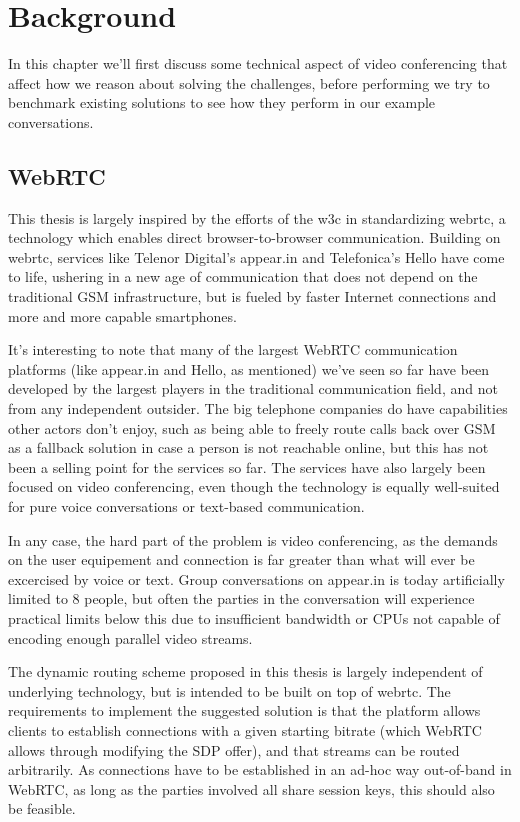 \chapter{Background}
\label{chp:background}

In this chapter we'll first discuss some technical aspect of video conferencing that affect how we reason about solving the challenges, before performing we try to benchmark existing solutions to see how they perform in our example conversations.

\section{WebRTC}

This thesis is largely inspired by the efforts of the \gls{w3c} in standardizing \gls{webrtc}, a technology which enables direct browser-to-browser communication. Building on \gls{webrtc}, services like Telenor Digital's appear.in and Telefonica's Hello have come to life, ushering in a new age of communication that does not depend on the traditional GSM infrastructure, but is fueled by faster Internet connections and more and more capable smartphones.

It's interesting to note that many of the largest WebRTC communication platforms (like appear.in and Hello, as mentioned) we've seen so far have been developed by the largest players in the traditional communication field, and not from any independent outsider. The big telephone companies do have capabilities other actors don't enjoy, such as being able to freely route calls back over GSM as a fallback solution in case a person is not reachable online, but this has not been a selling point for the services so far. The services have also largely been focused on video conferencing, even though the technology is equally well-suited for pure voice conversations or text-based communication.

In any case, the hard part of the problem is video conferencing, as the demands on the user equipement and connection is far greater than what will ever be excercised by voice or text. Group conversations on appear.in is today artificially limited to 8 people, but often the parties in the conversation will experience practical limits below this due to insufficient bandwidth or CPUs not capable of encoding enough parallel video streams.

The dynamic routing scheme proposed in this thesis is largely independent of underlying technology, but is intended to be built on top of \gls{webrtc}. The requirements to implement the suggested solution is that the platform allows clients to establish connections with a given starting bitrate (which WebRTC allows through modifying the SDP offer), and that streams can be routed arbitrarily. As connections have to be established in an ad-hoc way out-of-band in WebRTC, as long as the parties involved all share session keys, this should also be feasible.


